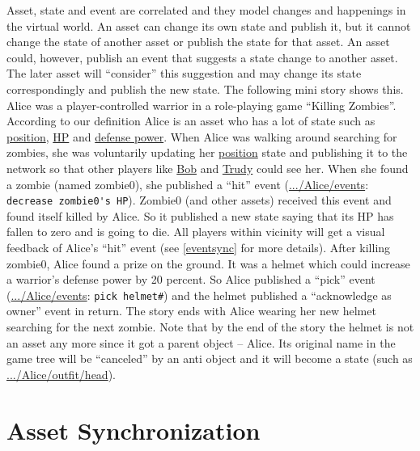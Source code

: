 Asset, state and event are correlated and they model changes and happenings in the virtual world. An asset can change its own state and publish it, but it cannot change the state of another asset or publish the state for that asset. An asset could, however, publish an event that suggests a state change to another asset. The later asset will ``consider'' this suggestion and may change its state correspondingly and publish the new state. The following mini story shows this. Alice was a player-controlled warrior in a role-playing game ``Killing Zombies''. According to our definition Alice is an asset who has a lot of state such as \url{position}, \url{HP} and \url{defense power}. When Alice was walking around searching for zombies, she was voluntarily updating her \url{position} state and publishing it to the network so that other players like \url{Bob} and \url{Trudy} could see her. When she found a zombie (named zombie0), she published a ``hit'' event (\url{.../Alice/events}: \verb|decrease zombie0's HP|). Zombie0 (and other assets) received this event and found itself killed by Alice. So it published a new state saying that its HP has fallen to zero and is going to die. All players within vicinity will get a visual feedback of Alice's ``hit'' event (see \ref{eventsync} for more details). After killing zombie0, Alice found a prize on the ground. It was a helmet which could increase a warrior's defense power by 20 percent. So Alice published a ``pick'' event (\url{.../Alice/events}: \verb|pick helmet#|) and the helmet published a ``acknowledge as owner'' event in return. The story ends with Alice wearing her new helmet searching for the next zombie. Note that by the end of the story the helmet is not an asset any more since it got a parent object -- Alice. Its original name in the game tree will be ``canceled'' by an anti object and it will become a state (such as \url{.../Alice/outfit/head}).




\section{Asset Synchronization}
\label{assetsync}

